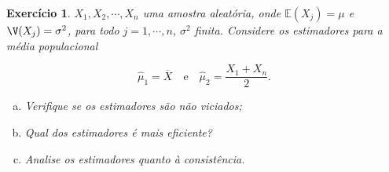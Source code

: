 \documentclass[letter,11pt]{article}
\newtheorem{exer}{Exercício}
\newcommand{\E}{\mathbb{E}}
\newcommand{\mat}[1]{\mbox{\boldmath{$#1$}}}
\begin{document}
%
%
%
%
\begin{exer} \rm 
$X_1,X_2,\cdots,X_n$ uma amostra aleatória, onde $\E(X_j)=\mu$ e $\V(X_j)=\sigma^2$, para todo $j=1,\cdots,n$, $\sigma^2$ finita. Considere os estimadores para a média populacional

$$\widehat{\mu}_1=\overline{X}\quad\mbox{e}\quad \widehat{\mu}_2=\frac{X_1+X_n}{2}.$$

\begin{enumerate}[a)]
\item Verifique se os estimadores são não viciados;

\item Qual dos estimadores é mais eficiente?

\item Analise os estimadores quanto à consistência.
\end{enumerate}
\end{exer}
\end{document}
